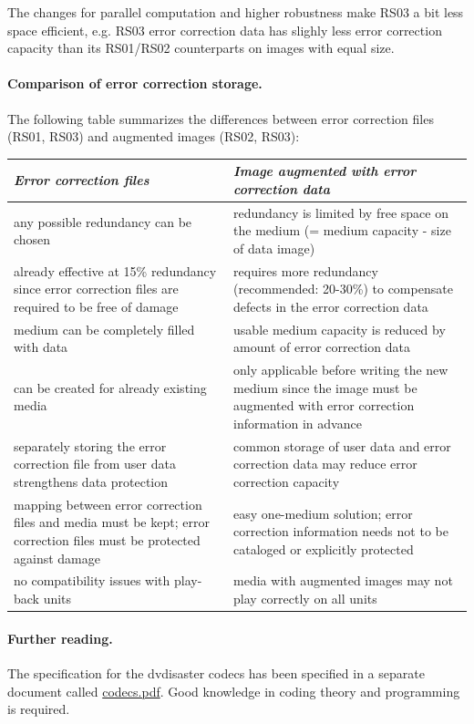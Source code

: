 The changes for parallel computation and higher robustness make RS03 a bit less space efficient, 
e.g. RS03 error correction data has slighly less error correction capacity than 
its RS01/RS02 counterparts on images with equal size.

\newpage

\paragraph{Comparison of error correction storage.} The following table summarizes the differences 
between error correction files (RS01, RS03) and augmented images (RS02, RS03):

\smallskip

\begin{tabular}{|p{}|p{}|}
\hline
{\em Error correction files} 	& 
{\em Image augmented with error correction data} \\
\hline
any possible redundancy can be chosen &	
redundancy is limited by free space on the medium (= medium capacity - size of data image) \\
\hline
already effective at 15\% redundancy since error correction files are required to be free of damage &
requires more redundancy (recommended: 20-30\%) to compensate defects in the error correction data \\
\hline
medium can be completely filled with data  &
usable medium capacity is reduced by amount of error correction data \\
\hline
can be created for already existing media & 
only applicable before writing the new medium since the image must be augmented with error correction information in advance \\
\hline
separately storing the error correction file from user data strengthens data protection &
common storage of user data and error correction data may reduce error correction capacity \\
\hline
mapping between error correction files and media must be kept; error correction files must be 
protected against damage &
easy one-medium solution; error correction information needs not to be cataloged or explicitly protected \\
\hline
no compatibility issues with play-back units &
media with augmented images may not play correctly on all units \\
\hline
\end{tabular}

\paragraph{Further reading.} The specification for the dvdisaster codecs 
has been specified in a separate document called \href{https://web.archive.org/web/20180428070843/http://dvdisaster.net/downloads/codecs.pdf}{codecs.pdf}. 
Good knowledge in coding theory and programming is required.


